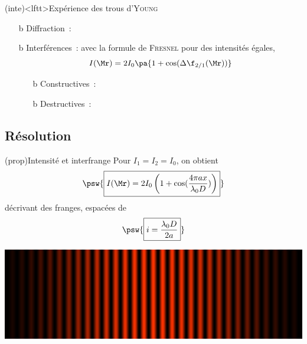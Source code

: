 \documentclass[../../main/main.tex]{subfiles}
\begin{document}
\begin{tcb*}(inte)<lftt>{Expérience des trous d'\textsc{Young}}
	\begin{itemize}
		\item[b]{Diffraction}~:
		\item[b]{Interférences}~:
		      avec la formule de \textsc{Fresnel} pour des intensités égales,
		      \[
			      I(\Mr) = 2I_0 \pa{1+\cos(\Delta{\f}_{2/1}(\Mr))}
		      \]
		      \begin{itemize}
			      \item[b]{Constructives}~:
			      \item[b]{Destructives}~:
		      \end{itemize}
	\end{itemize}
	\vspace{-15pt}
\end{tcb*}


\subsection{Résolution}
\begin{tcb*}[sidebyside, righthand ratio=.5](prop){Intensité et interfrange}
	Pour $I_1 = I_2 = I_0$, on obtient
	\[
		\psw{%
			\boxed{I(\Mr) = 2I_0 \left( 1 + \cos (\frac{4\pi ax}{\lambda_0 D}) \right)}
		}
	\]
	décrivant des franges, espacées de
	\[
		\psw{%
			\boxed{i = \frac{\lambda_0 D}{2a}}
		}
	\]
	\tcblower
	\begin{center}
		\includegraphics[width=\linewidth]{young_intensity}
	\end{center}
\end{tcb*}
\end{document}
